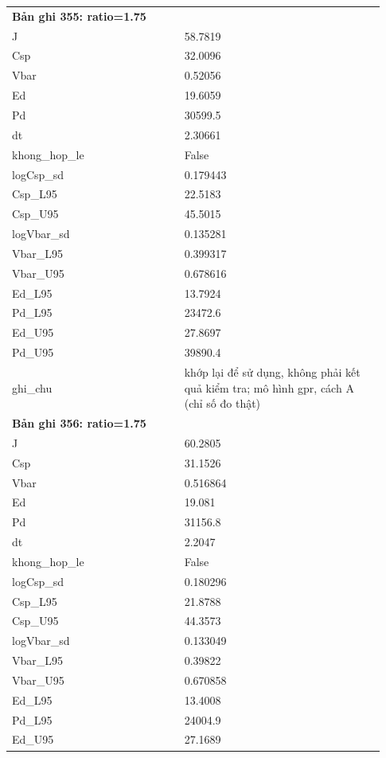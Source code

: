 \begin{longtable}{p{0.43\linewidth}p{0.50\linewidth}}
\midrule
\multicolumn{2}{p{0.95\linewidth}}{\textbf{Bản ghi 355: ratio=1.75}} \\
J & 58.7819 \\
Csp & 32.0096 \\
Vbar & 0.52056 \\
Ed & 19.6059 \\
Pd & 30599.5 \\
dt & 2.30661 \\
khong\_\allowbreak hop\_\allowbreak le & False \\
logCsp\_\allowbreak sd & 0.179443 \\
Csp\_\allowbreak L95 & 22.5183 \\
Csp\_\allowbreak U95 & 45.5015 \\
logVbar\_\allowbreak sd & 0.135281 \\
Vbar\_\allowbreak L95 & 0.399317 \\
Vbar\_\allowbreak U95 & 0.678616 \\
Ed\_\allowbreak L95 & 13.7924 \\
Pd\_\allowbreak L95 & 23472.6 \\
Ed\_\allowbreak U95 & 27.8697 \\
Pd\_\allowbreak U95 & 39890.4 \\
ghi\_\allowbreak chu & khớp lại để sử dụng, không phải kết quả kiểm tra; mô hình gpr, cách A (chỉ số đo thật) \\
\midrule
\multicolumn{2}{p{0.95\linewidth}}{\textbf{Bản ghi 356: ratio=1.75}} \\
J & 60.2805 \\
Csp & 31.1526 \\
Vbar & 0.516864 \\
Ed & 19.081 \\
Pd & 31156.8 \\
dt & 2.2047 \\
khong\_\allowbreak hop\_\allowbreak le & False \\
logCsp\_\allowbreak sd & 0.180296 \\
Csp\_\allowbreak L95 & 21.8788 \\
Csp\_\allowbreak U95 & 44.3573 \\
logVbar\_\allowbreak sd & 0.133049 \\
Vbar\_\allowbreak L95 & 0.39822 \\
Vbar\_\allowbreak U95 & 0.670858 \\
Ed\_\allowbreak L95 & 13.4008 \\
Pd\_\allowbreak L95 & 24004.9 \\
Ed\_\allowbreak U95 & 27.1689 \\

\end{longtable}
